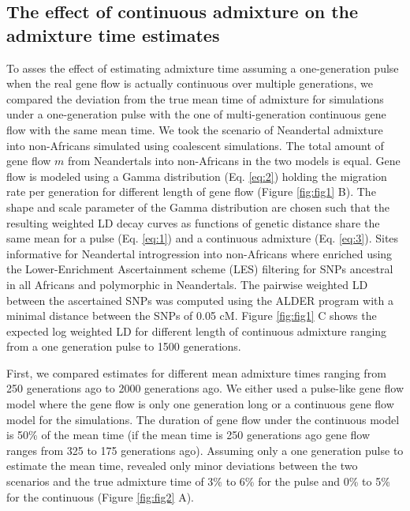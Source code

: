 \documentclass[]{article}
\begin{document}
\subsection{The effect of continuous admixture on the admixture time estimates}\label{the effect of continuous admixture on the admixture time estimates}


To asses the effect of estimating admixture time assuming a one-generation pulse when the real gene flow is actually continuous over multiple generations,
we compared the deviation from the true mean time of admixture for simulations under a one-generation pulse with the one of multi-generation continuous gene flow with the same mean time. We took the scenario of Neandertal admixture into non-Africans simulated using coalescent simulations.
The total amount of gene flow \(m\) from Neandertals into non-Africans
in the two models is equal. Gene flow is modeled using a Gamma
distribution (Eq. \ref{eq:2}) holding the migration rate per generation
for different length of gene flow (Figure \ref{fig:fig1} B).
The shape and scale parameter of the Gamma distribution are chosen such
that the resulting weighted LD decay curves as functions of genetic
distance share the same mean for a pulse (Eq. \ref{eq:1}) and a
continuous admixture (Eq. \ref{eq:3}). Sites informative for Neandertal
introgression into non-Africans where enriched using the
Lower-Enrichment Ascertainment scheme (LES) filtering for SNPs ancestral in
all Africans and polymorphic in Neandertals. The pairwise weighted LD
between the ascertained SNPs was computed using the ALDER program with a minimal distance between the SNPs of 0.05 cM.
Figure \ref{fig:fig1} C shows the expected log weighted LD for different
length of continuous admixture ranging from a one generation pulse to
1500 generations.

First, we compared estimates for different mean admixture times ranging
from 250 generations ago to 2000 generations ago. We either used a
pulse-like gene flow model where the gene flow is only one generation
long or a continuous gene flow model for the simulations. The duration
of gene flow under the continuous model is 50\% of the mean time (if the
mean time is 250 generations ago gene flow ranges from 325 to 175
generations ago). Assuming only a one generation pulse to estimate the
mean time, revealed only minor deviations between the two scenarios and
the true admixture time of 3\% to 6\% for the pulse and 0\% to 5\% for
the continuous (Figure \ref{fig:fig2} A).
\end{document}
